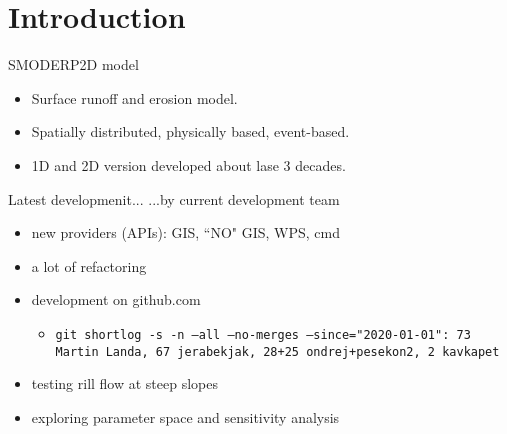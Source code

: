 \section{Introduction}

\begin{frame}{SMODERP2D model}
   \begin{itemize}
       \item Surface runoff and erosion model.
       \item Spatially distributed, physically based, event-based.
       \item 1D and 2D version developed about lase 3 decades.
   \end{itemize}
\pause

   \begin{block}{Latest developmenit...}
   ...by current development team
   \begin{itemize}
       \item new providers (APIs): GIS, ``NO" GIS, WPS, cmd
       \item a lot of refactoring
       \item development on github.com
       \begin{itemize}
           \item \texttt{git shortlog -s -n --all --no-merges --since="2020-01-01": 73  Martin Landa,  67  jerabekjak, 28+25  ondrej+pesekon2, 2  kavkapet}
       \end{itemize}
       \item testing rill flow at steep slopes
       \item exploring parameter space and sensitivity analysis
   \end{itemize}
   \end{block}

\end{frame}



